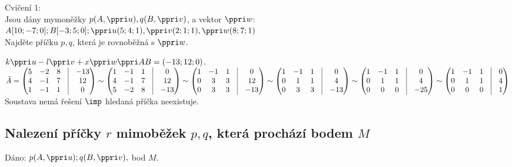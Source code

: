 	\Pr Cvičení 1:\\
	Jsou dány mymoněžky $p(A,\ve u),q(B,\ve v)$, a vektor $\ve w$:\\
	$A[10;-7;0]; B[-3;5;0]; \ve u (5;4;1), \ve v (2;1;1), \ve w (8;7;1)$\\
	Najděte příčku $p,q$, která je rovnoběžná s $\ve w$.

	$k\ve u-l\ve v + x \ve w\ve {AB}= (-13;12;0)$.
	 $ \bar{A} = \begin{pmatrix}
		 5 &-2 &8 &\vline& -13 \\ 
		 4 &-1 &7 &\vline& 12 \\ 
		 1 &-1 &1 &\vline& 0 \\ 
	 \end{pmatrix}
	 \sim
	 \begin{pmatrix}
		 1 &-1 &1 &\vline& 0 \\ 
		 4 &-1 &7 &\vline& 12 \\ 
		 5 &-2 &8 &\vline& -13 \\ 
	 \end{pmatrix}
	 \sim
	 \begin{pmatrix}
		 1 &-1 &1 &\vline& 0 \\ 
		 0 &3 &3 &\vline& 12 \\ 
		 0 &3 &3 &\vline& -13 \\ 
	 \end{pmatrix}
	 \sim
	 \begin{pmatrix}
		 1 &-1 &1 &\vline& 0 \\ 
		 0 &1 &1 &\vline& 4 \\ 
		 0 &3 &3 &\vline& -13 \\ 
	 \end{pmatrix}
	 \sim
	 \begin{pmatrix}
		 1 &-1 &1 &\vline& 0 \\ 
		 0 &1 &1 &\vline& 4 \\ 
		 0 &0 &0 &\vline& -25 \\ 
	 \end{pmatrix}
	 \sim
	 \begin{pmatrix}
		 1 &-1 &1 &\vline& 0 \\ 
		 0 &1 &1 &\vline& 4 \\ 
		 0 &0 &0 &\vline& 1 \\ 
	 \end{pmatrix}
	  $ 
	  Soustava nemá řešení $\imp$ hledaná příčka neexistuje.

    \subsection{Nalezení příčky $r$ mimoběžek $p, q$, která prochází bodem $M$}
\Poz Dáno: $p(A,\ve u);q(B,\ve v),$ bod $M$.

